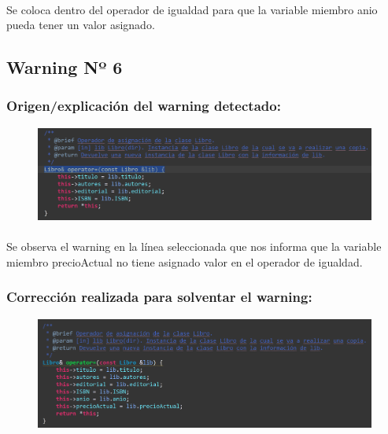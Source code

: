 			\paragraph{}Se coloca dentro del operador de igualdad para que la variable miembro anio pueda tener un valor asignado.
			
	\subsection{Warning Nº 6}
	
		\subsubsection{Origen/explicación del warning detectado:}
		
			\begin{figure}[H]
				\centering
				\includegraphics[scale=0.55]{img/esteban4.png}
				\label{esteban4}
			\end{figure}
		
			\paragraph{}Se observa el warning en la línea seleccionada que nos informa que la variable miembro precioActual no tiene asignado valor en el operador de igualdad.
			
		\subsubsection{Corrección realizada para solventar el warning:}
		
			\begin{figure}[H]
				\centering
				\includegraphics[scale=0.55]{img/esteban5.png}
				\label{esteban5}
			\end{figure}
		
